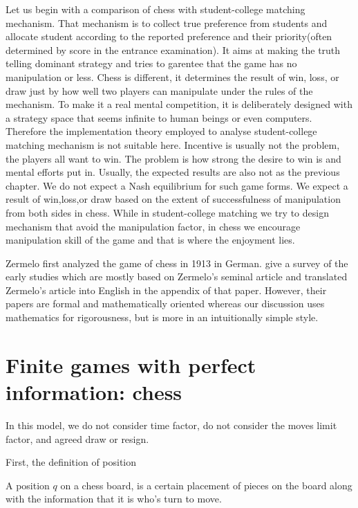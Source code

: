  Let us begin with a comparison of chess with student-college matching mechanism. That mechanism is to collect true preference from students and allocate student according to the reported preference 
 and their priority(often determined by score in the entrance examination). It
 aims at making the truth telling dominant strategy and tries to
 garentee that the game has no manipulation or less. Chess is different, it determines the result of win, loss, or draw just by how well two players can manipulate under the rules of the mechanism. 
 To make it a real mental competition, it is deliberately designed with a strategy space that seems infinite to human beings or even computers.
 Therefore the implementation theory employed to analyse student-college matching mechanism is not suitable here. Incentive is usually not the problem, the players all want to win.
 The problem is how strong the desire to win is and mental efforts put in. Usually, the expected results are also not  as the previous chapter.
 We do not expect a Nash equilibrium for such game forms. We expect a result of win,loss,or draw based on the extent of successfulness of manipulation  from both sides in chess.
 While in student-college matching we try to design mechanism that avoid the manipulation factor, in chess we encourage manipulation skill of the game and that is where the enjoyment lies.

Zermelo first analyzed the game of chess in 1913 in German. \parencite{walker2001} give a survey of the early studies which are mostly based on Zermelo's seminal article  and translated Zermelo's article into English in the appendix 
of that paper. However, their papers are formal and mathematically oriented whereas our discussion uses mathematics for rigorousness, but is more in an intuitionally simple style.






\section{Finite games with perfect information: chess }

In this model, we do not consider time factor, do not consider the moves limit factor, and agreed draw or resign.

First, the definition of position

\begin{definition}
A position $q$ on a chess board, is a certain placement of pieces on the board along with the information that it is who's turn to move.
\end{definition}

